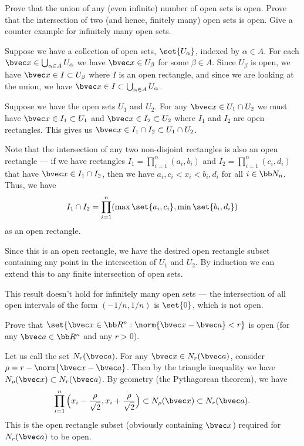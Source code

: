 \documentclass[12pt, letterpaper]{hmcpset}
\begin{document}
\pagebreak

\begin{problem}[14]
	Prove that the union of any (even infinite) number of open sets is open. Prove that the intersection of two (and hence, finitely many) open sets is open. Give a counter example for infinitely many open sets.
\end{problem}

\begin{solution}
	Suppose we have a collection of open sets, $\set{U_{\alpha}}$, indexed by $\alpha \in A$. For each $\bvec x \in \bigcup_{\alpha \in A} U_\alpha$ we have $\bvec x \in U_{\beta}$ for some $\beta \in A$. Since $U_\beta$ is open, we have $\bvec x \in I \subset U_\beta$ where $I$ is an open rectangle, and since we are looking at the union, we have $\bvec x \in I \subset \bigcup_{\alpha \in A} U_\alpha$. 

	Suppose we have the open sets $U_1$ and $U_2$. For any $\bvec x \in U_1 \cap U_2$ we must have $\bvec x \in I_1 \subset U_1$ and $\bvec x \in I_2 \subset U_2$ where $I_1$ and $I_2$ are open rectangles. This gives us $\bvec x \in I_1 \cap I_2 \subset U_1 \cap U_2$. 

	Note that the intersection of any two non-disjoint rectangles is also an open rectangle --- if we have rectangles $I_1 = \prod_{i = 1}^n (a_i, b_i)$ and $I_2 = \prod_{i = 1}^n (c_i, d_i)$ that have $\bvec x \in I_1 \cap I_2$, then we have $a_i, c_i < x_i < b_i, d_i$ for all $i \in \bb N_n$. Thus, we have
	\[
		I_1 \cap I_2 = \prod_{i = 1}^n (\max \set{a_i, c_i}, \min \set{b_i, d_i})
	\]
	as an open rectangle. 

	Since this is an open rectangle, we have the desired open rectangle subset containing any point in the intersection of $U_1$ and $U_2$. By induction we can extend this to any finite intersection of open sets. 

	This result doesn't hold for infinitely many open sets --- the intersection of all open intervals of the form $(-1/n, 1/n)$ is $\set{0}$, which is not open.
\end{solution}

\pagebreak

\begin{problem}[15]
	Prove that $\set{\bvec x \in \bb R^n : \norm{\bvec x - \bvec a} < r}$ is open (for any $\bvec a \in \bb R^n$ and any $r > 0$).
\end{problem}

\begin{solution}
	Let us call the set $N_r(\bvec a)$. For any $\bvec x \in N_r(\bvec a)$, consider $\rho = r - \norm{\bvec x - \bvec a}$. Then by the triangle inequality we have $N_\rho(\bvec x) \subset N_r(\bvec a)$. By geometry (the Pythagorean theorem), we have
	\[
		\prod_{i = 1}^n \Big ( x_i - \frac{\rho}{\sqrt 2}, x_i + \frac{\rho}{\sqrt 2} \Big ) \subset N_\rho(\bvec x) \subset N_r(\bvec a).
	\]
	This is the open rectangle subset (obviously containing $\bvec x$) required for $N_r(\bvec a)$ to be open.
\end{solution}
\end{document}
